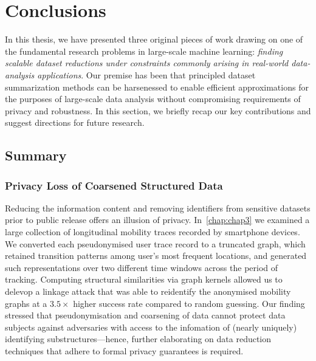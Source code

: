 \chapter{Conclusions}
\label{chap:chap6}
\renewcommand*{\MyPath}{../Chapter6}%

In this thesis, we have presented three original pieces of work drawing on one of the fundamental research problems in large-scale machine learning: \emph{finding scalable dataset reductions under constraints commonly arising in real-world data-analysis applications}. Our premise has been that principled dataset summarization methods can be harsenessed to enable efficient approximations for the purposes of large-scale data analysis without compromising requirements of privacy and robustness. In this section, we briefly recap our key contributions and suggest directions for future research.

\section{Summary}
\label{sec:summary}


\subsection{Privacy Loss of Coarsened Structured Data}
\label{subsec:ch3-summary}
Reducing the information content and removing identifiers from sensitive datasets prior to public release offers an illusion of privacy. In~\cref{chap:chap3} we examined a large collection of longitudinal mobility traces recorded by smartphone devices. We converted each pseudonymised user trace record to a truncated graph, which retained transition patterns among user's most frequent locations, and generated such representations over two different time windows across the period of tracking. Computing structural similarities via graph kernels allowed us to delevop a linkage attack that was able to reidentify the anonymised mobility graphs at a $3.5\times$ higher success rate compared to random guessing. Our finding stressed that pseudonymisation and coarsening of data cannot protect data subjects against adversaries with access to the infomation of (nearly uniquely) identifying substructures---hence, further elaborating on data reduction techniques that adhere to formal privacy guarantees is required.

